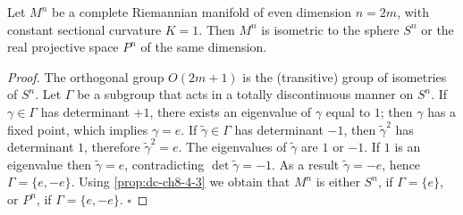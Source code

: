 \begin{proposition}[even-dimensional space forms of $K=1$]
  \label{prop:dc-ch8-4-4}
  Let $M^n$ be a complete Riemannian manifold of even dimension $n=2m$, with constant
  sectional curvature $K=1$. Then $M^n$ is isometric to the sphere $S^n$ or the real
  projective space $P^n$ of the same dimension.
\end{proposition}
\begin{proof}
  The orthogonal group $O(2m+1)$ is the (transitive) group of isometries of
  $S^n$. Let $\Gamma$ be a subgroup that acts in a totally discontinuous manner on
  $S^n$. If $\gamma\in\Gamma$ has determinant $+1$, there exists an eigenvalue of
  $\gamma$ equal to $1$; then $\gamma$ has a fixed point, which implies $\gamma=e$.
  If $\tilde{\gamma}\in\Gamma$ has determinant $-1$, then $\tilde{\gamma}^2$ has
  determinant $1$, therefore $\tilde{\gamma}^2=e$. The eigenvalues of
  $\tilde{\gamma}$ are $1$ or $-1$. If $1$ is an eigenvalue then $\tilde{\gamma}=e$,
  contradicting $\det\tilde{\gamma}=-1$. As a result $\tilde{\gamma}=-e$, hence
  $\Gamma=\{e,-e\}$. Using \cref{prop:dc-ch8-4-3} we obtain that $M^n$ is either $S^n$, if
  $\Gamma=\{e\}$, or $P^n$, if $\Gamma=\{e,-e\}$. $\square$
\end{proof}

